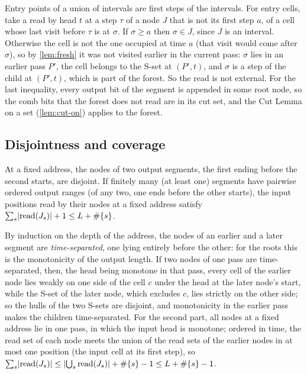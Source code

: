 \begin{outline}
Entry points of a union of intervals are first steps of the intervals. For entry cells, take a
read by head $t$ at a step $\tau$ of a node $J$ that is not its first step $a$, of a cell whose last visit
before $\tau$ is at $\sigma$. If $\sigma\ge a$ then $\sigma\in J$, since $J$ is an interval. Otherwise the
cell is not the one occupied at time $a$ (that visit would come after $\sigma$), so by \cref{lem:fresh} it
was not visited earlier in the current pass: $\sigma$ lies in an earlier pass $P'$, the cell belongs to the
S-set at $(P',t)$, and $\sigma$ is a step of the child at $(P',t)$, which is part of the forest. So the read
is not external. For the last inequality, every output bit of the segment is
appended in some root node, so the comb bits that the forest does not read are in its cut set,
and the Cut Lemma on a set (\cref{lem:cut-on}) applies to the forest.
\end{outline}

\subsection{Disjointness and coverage}

\begin{lemma}[Disjointness]\label{lem:disjoint}
At a fixed address, the nodes of two output segments, the first ending before the second starts,
are disjoint. If finitely many (at least one) segments have pairwise ordered output ranges (of any two,
one ends before the other starts), the input positions read by their nodes at a fixed address satisfy
$\sum_s\lvert \mathrm{read}(J_s) \rvert+1\le L+\#\{s\}$.
\end{lemma}

\begin{outline}
By induction on the depth of the address, the nodes of an earlier and a later segment are
\emph{time-separated}, one lying entirely before the other: for the roots this is the monotonicity
of the output length. If two nodes of one pass are time-separated, then, the head being monotone in
that pass, every cell of the earlier node lies weakly on one side of the cell $c$ under the head at the
later node's start, while the S-set of the later node, which excludes $c$, lies strictly on the other side;
so the hulls of the two S-sets are disjoint, and monotonicity in the earlier pass makes the children
time-separated. For the second part, all nodes at a fixed address lie in one pass, in which the input head
is monotone; ordered in time, the read set of each node meets the union of the read sets of the earlier
nodes in at most one position (the input cell at its first step), so
$\sum_s\lvert \mathrm{read}(J_s) \rvert\le\lvert \bigcup_s\mathrm{read}(J_s) \rvert+\#\{s\}-1\le L+\#\{s\}-1$.
\end{outline}

